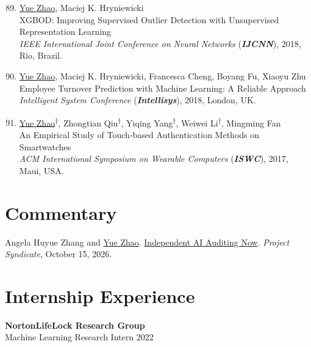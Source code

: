 \documentclass[margin,line,pifont,palatino,courier]{res}
\newcommand{\equalcontrib}{\textsuperscript{$\dagger$}}
\newenvironment{benumerate}[1]{
    \let\oldItem\item
    \def\item{\addtocounter{enumi}{-2}\oldItem}
    \begin{enumerate}[leftmargin=0.25in,label=\textcolor{uscred}{\arabic*.}]
    \setcounter{enumi}{#1}
    \addtocounter{enumi}{1}
}{
    \end{enumerate}
}
\begin{document}
\begin{resume}
\begin{benumerate}{88}
    \item \underline{Yue Zhao}, Maciej K. Hryniewicki \\
    XGBOD: Improving Supervised Outlier Detection with Unsupervised Representation Learning \\
    \textit{IEEE International Joint Conference on Neural Networks} (\textbf{\textit{IJCNN}}), 2018, Rio, Brazil.
    
    \item \underline{Yue Zhao}, Maciej K. Hryniewicki, Francesca Cheng, Boyang Fu, Xiaoyu Zhu \\
    Employee Turnover Prediction with Machine Learning: A Reliable Approach \\
    \textit{Intelligent System Conference} (\textbf{\textit{Intellisys}}), 2018, London, UK.
    
    \item \underline{Yue Zhao}\equalcontrib, Zhongtian Qiu\equalcontrib, Yiqing Yang\equalcontrib, Weiwei Li\equalcontrib, Mingming Fan \\
    An Empirical Study of Touch-based Authentication Methods on Smartwatches \\
    \textit{ACM International Symposium on Wearable Computers} (\textbf{\textit{ISWC}}), 2017, Maui, USA.
    
\end{benumerate}


\section{\sc Commentary}

Angela Huyue Zhang and \underline{Yue Zhao}. \href{https://www.project-syndicate.org/commentary/independent-ai-auditing-possible-and-necessary-by-angela-huyue-zhang-and-yue-zhao-2026-10}{Independent AI Auditing Now}. \textit{Project Syndicate}, October 15, 2026.



\section{\sc Internship Experience}

\textbf{NortonLifeLock Research Group} \\
Machine Learning Research Intern  \hfill 2022


\end{resume}
\end{document}
